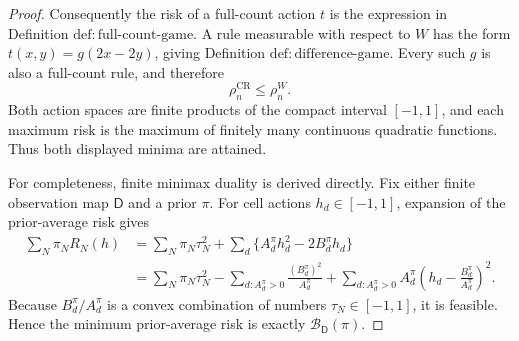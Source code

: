 \documentclass{article}
\begin{document}
\begin{proof}
Consequently the risk of a full-count action \(t\) is the expression in Definition \(\mathrm{def{:}full\mbox{-}count\mbox{-}game}\).  A rule measurable with respect to \(W\) has the form \(t(x,y)=g(2x-2y)\), giving Definition \(\mathrm{def{:}difference\mbox{-}game}\).  Every such \(g\) is also a full-count rule, and therefore
\[
 \rho_n^{\mathrm{CR}}\leq \rho_n^W.
\]
Both action spaces are finite products of the compact interval \([-1,1]\), and each maximum risk is the maximum of finitely many continuous quadratic functions.  Thus both displayed minima are attained.

For completeness, finite minimax duality is derived directly.  Fix either finite observation map \(\mathsf D\) and a prior \(\pi\).  For cell actions \(h_d\in[-1,1]\), expansion of the prior-average risk gives
\[
 \begin{aligned}
 \sum_N\pi_NR_N(h)
 &=\sum_N\pi_N\tau_N^2+
   \sum_d\{A_d^\pi h_d^2-2B_d^\pi h_d\}\\
 &=\sum_N\pi_N\tau_N^2-
   \sum_{d:A_d^\pi>0}\frac{(B_d^\pi)^2}{A_d^\pi}
   +\sum_{d:A_d^\pi>0}A_d^\pi
      \left(h_d-\frac{B_d^\pi}{A_d^\pi}\right)^2.
 \end{aligned}
\]
Because \(B_d^\pi/A_d^\pi\) is a convex combination of numbers \(\tau_N\in[-1,1]\), it is feasible.  Hence the minimum prior-average risk is exactly \(\mathcal B_{\mathsf D}(\pi)\).


\end{proof}
\end{document}
